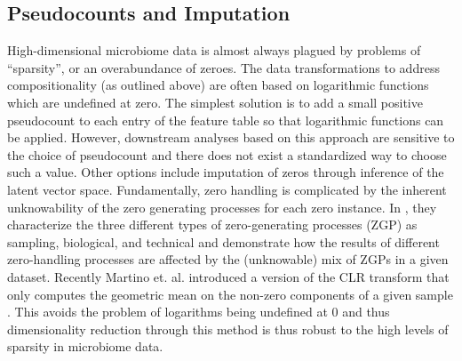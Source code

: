 \subsection{Pseudocounts and Imputation} High-dimensional microbiome data is almost always plagued by problems of “sparsity”, or an overabundance of zeroes. The data transformations to address compositionality (as outlined above) are often based on logarithmic functions which are undefined at zero. The simplest solution is to add a small positive pseudocount to each entry of the feature table so that logarithmic functions can be applied. However, downstream analyses based on this approach are sensitive to the choice of pseudocount \cite{Kumar2018-or} and there does not exist a standardized way to choose such a value. Other options include imputation of zeros \cite{Martin-Fernandez2003-oe} through inference of the latent vector space. Fundamentally, zero handling is complicated by the inherent unknowability of the zero generating processes for each zero instance. In \cite{Silverman2020-zl}, they characterize the three different types of zero-generating processes (ZGP) as sampling, biological, and technical and demonstrate how the results of different zero-handling processes are affected by the (unknowable) mix of ZGPs in a given dataset. Recently Martino et. al. introduced a version of the CLR transform that only computes the geometric mean on the non-zero components of a given sample \cite{Martino2019-op}. This avoids the problem of logarithms being undefined at 0 and thus dimensionality reduction through this method is thus robust to the high levels of sparsity in microbiome data.

